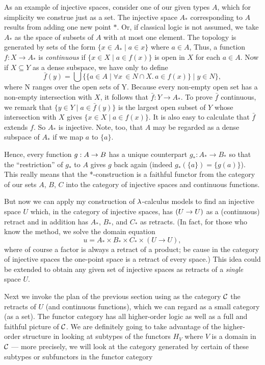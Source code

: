 As an example of injective spaces, consider one of our given types $A$, which for
simplicity we construe just as a set. The injective space $A_*$ corresponding to $A$
results from adding one new point $*$. Or, if classical logic is not assumed, we take
$A_*$ as the space of subsets of $A$ with at most one element. The topology is generated
by sets of the form $\{x \in A_* \mid  a \in x\}$ where $a \in A$, Thus, a function $f : X
\to A_*$ is {\it continuous} if $\{x \in X \mid a \in f(x)\}$ is open in $X$ for each $a
\in A$. Now if $X \subseteq Y$ as a dense subspace, we have only to define
$$
\bar{f}(y) = \bigcup \bigl\{\{a \in A \mid \forall x\, \in N \cap X.\, a \in f(x)\} \mid y \in N\bigr \},
$$
where N ranges over the open sets of Y. Because every non-empty open set has a non-empty
intersection with $X$, it follows that $\bar{f} : Y \to A_*$. To prove $\bar{f}$
continuous, we remark that $\{ y \in Y \mid a \in \bar{f}(y)\}$ is the largest open subset of $Y$ whose
intersection with $X$ gives $\{x \in X \mid a \in f(x)\}$. It is also easy to calculate
that $\bar{f}$ extends $f$. So $A_*$ is injective. Note, too, that $A$ may be regarded as
a dense subspace of $A_*$ if we map $a$ to $\{a\}$.

Hence, every function $g:A \rightarrow B$ has a unique counterpart $g_* : A_*\to B_*$ so that the
``restriction'' of $g_*$ to $A$ gives $g$ back again (indeed $g_*(\{a\}) = \{g(a)\}$).
This really means that the *-construction is a faithful functor from the category of our
sets $A$, $B$, $C$ into the category of injective spaces and continuous functions.

But now we can apply my construction of $\lambda$-calculus models to find an injective space
$U$ which, in the category of injective spaces, has $(U\rightarrow U)$ as a (continuous) retract and in
addition has $A_*$, $B_*$, and $C_*$ as retracts. (In fact, for those who know the method,
we solve the domain equation
$$
u = A_* \times B_* \times C_* \times (U \to U),
$$
where of course a factor is always a retract of a product; be cause in the category of
injective spaces the one-point space is a retract of every space.) This idea could be
extended to obtain any given set of injective spaces as retracts of a {\it single} space
$U$.

Next we invoke the plan of the previous section using as the category $\mathcal C$ the retracts of
$U$ (and continuous functions), which we can regard as a small category (as a set). The
functor category has all higher-order logic as well as a full and faithful picture of
$\mathcal C$. We are definitely going to take advantage of the higher-order structure in looking
at subtypes of the functors $H_V$ where $V$ is a domain in $\mathcal C$ --- more precisely, we
will look at the category generated by certain of these subtypes or subfunctors in the
functor category

